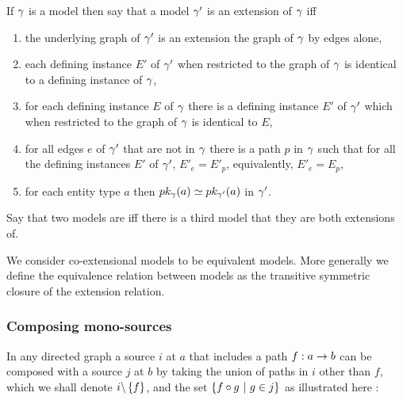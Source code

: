 \begin{definition}
If $\genericmodel$ is a model then say that a model $\genericmodel'$ is an extension of 
$\genericmodel$ iff 
\begin{enumerate}
\item the underlying graph of $\genericmodel'$ is an extension the graph of $\genericmodel$
by edges alone, 
\item each defining instance $E'$ of $\genericmodel'$ when restricted to the graph of $\genericmodel$
is identical to a defining instance of $\genericmodel$,
\item for each defining instance $E$ of $\genericmodel$ there is a defining instance $E'$ of $\genericmodel'$ which when restricted to the graph of $\genericmodel$
is identical to $E$,
\item for all edges $e$ of $\genericmodel'$ that are not in $\genericmodel$ there is a path 
$p$ in $\genericmodel$ such that for all the defining instances $E'$ of $\genericmodel'$,
$E'_e=E'_p$, equivalently, $E'_e=E_p$,
\item for each entity type $a$  then $\pk[\genericmodel]{a} \simeq \pk[\genericmodel']{a}$ in $\genericmodel'$. 
\end{enumerate}
\end{definition}

\begin{definition}
Say that two models are   iff there is a third model that they are both extensions of.
\end{definition}
We consider co-extensional models to be equivalent models. More generally we define the equivalence 
relation between models as the transitive symmetric closure of the extension relation.  

\subsubsection{Composing mono-sources}

In any directed graph a source $i$ at $a$ that includes a path $f:a \morph b$ can be composed with a source $j$ at $b$ by taking the union of paths in $i$ other than $f$, which we shall denote $i\backslash \set{f}$, and the set $\setsuchthat{f \circ g}{g \in j}$ as illustrated here :

